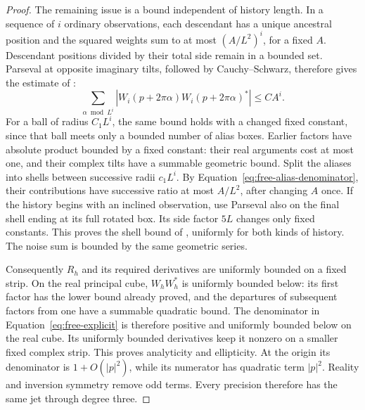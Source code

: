 \begin{proof}
The remaining issue is a bound independent of history length.  In a
sequence of $i$ ordinary observations, each descendant has a unique
ancestral position and the squared weights sum to at most
$(A/L^2)^i$, for a fixed $A$.  Descendant positions divided by their
total side remain in a bounded set.  Parseval at opposite imaginary
tilts, followed by Cauchy--Schwarz, therefore gives the estimate of
:
\[
 \sum_{\alpha\bmod L^i}
   |W_i(p+2\pi\alpha)W_i(p+2\pi\alpha)^*|
 \le C A^i.
\]
For a ball of radius $C_1L^i$, the same bound holds with a changed
fixed constant, since that ball meets only a bounded number of alias
boxes.  Earlier factors have absolute product bounded by a fixed
constant: their real arguments cost at most one, and their complex
tilts have a summable geometric bound.  Split the aliases into shells
between successive radii $c_1L^i$.  By
Equation~\eqref{eq:free-alias-denominator}, their contributions have
successive ratio at most $A/L^2$, after changing $A$ once.  If the
history begins with an inclined observation, use Parseval also on the
final shell ending at its full rotated box.  Its side factor $5L$
changes only fixed constants.  This proves the shell bound of
, uniformly for both kinds of history.
The noise sum is bounded by the same geometric series.

Consequently $R_{h}$ and its required derivatives are
uniformly bounded on a fixed strip.  On the real principal cube,
$W_{h}W_{h}^*$ is uniformly bounded below: its first
factor has the lower bound already proved, and the departures of
subsequent factors from one have a summable quadratic bound.
The denominator in Equation~\eqref{eq:free-explicit} is therefore
positive and uniformly bounded below on the real cube.  Its uniformly
bounded derivatives keep it nonzero on a smaller fixed complex strip.
This proves analyticity and ellipticity.  At the origin its denominator
is $1+O(|p|^2)$, while its numerator has quadratic term $|p|^2$.
Reality and inversion symmetry remove odd terms.  Every precision
therefore has the same jet through degree three.


\end{proof}
